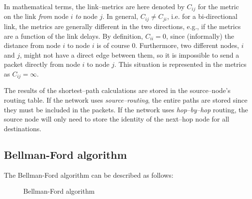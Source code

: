 \documentclass[a4paper]{article}
\newcommand{\eg}{e.g.,\xspace}
\begin{document}
In mathematical terms, the link--metrics are here denoted by $C_{ij}$
for the metric on the link \emph{from} node $i$ \emph{to} node $j$. In
general, $C_{ij}\ne{}C_{ji}$, i.e. for a bi-directional link, the
metrics are generally different in the two directions, \eg if the
metrics are a function of the link delays. By definition,
$C_{ii}=0$, since (informally) the distance from node $i$ to node $i$
is of course 0. Furthermore, two different nodes, $i$ and $j$, might
not have a direct edge between them, so it is impossible to send a
packet directly from node $i$ to node $j$. This situation is
represented in the metrics as $C_{ij}=\infty$.

The results of the shortest--path calculations are stored in the
source--node's routing table. If the network uses
\emph{source--routing}, the entire paths are stored since they
must be included in the packets. If the network uses
\emph{hop--by--hop} routing, the source node will only need to
store the identity of the next--hop node for all destinations.

\subsection{Bellman-Ford algorithm}
The Bellman-Ford algorithm can be described as follows:

\begin{figure}[ht]
\setlength{\fboxsep}{9pt}
\begin{center}\noindent{}
\end{center}
\caption{\label{fig:BFAlgo}Bellman-Ford algorithm}
\end{figure}
\end{document}
